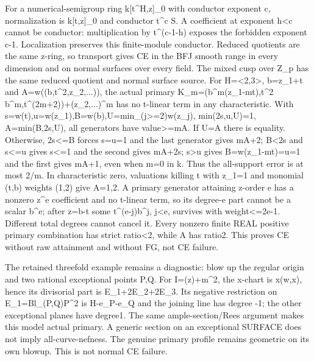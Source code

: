 \documentclass[11pt]{article}
\begin{document}
For a numerical-semigroup ring k[t\textasciicircum{}H,z]\_0 with conductor exponent c, normalization is k[t,z]\_0 and conductor t\textasciicircum{}c S. A coefficient at exponent h\textless{}c cannot be conductor: multiplication by t\textasciicircum{}(c-1-h) exposes the forbidden exponent c-1. Localization preserves this finite-module conductor. Reduced quotients are the same z-ring, so transport gives CE in the BFJ smooth range in every dimension and on normal surfaces over every field. The mixed cusp over Z\_p has the same reduced quotient and normal surface source. For H=\textless{}2,3\textgreater{}, b=z\_1+t and A=w((b,t\textasciicircum{}2,z\_2,...)), the actual primary K\_m=(b\textasciicircum{}m(z\_1-mt),t\textasciicircum{}2 b\textasciicircum{}m,t\textasciicircum{}(2m+2))+(z\_2,...)\textasciicircum{}m has no t-linear term in any characteristic. With s=w(t),u=w(z\_1),B=w(b),U=min\_(j\textgreater{}=2)w(z\_j), min(2s,u,U)=1, A=min(B,2s,U), all generators have value\textgreater{}=mA. If U=A there is equality. Otherwise, 2s\textless{}=B forces s=u=1 and the last generator gives mA+2; B\textless{}2s and s\textless{}=u gives s\textless{}=1 and the second gives mA+2s; s\textgreater{}u gives B=w(z\_1-mt)=u=1 and the first gives mA+1, even when m=0 in k. Thus the all-support error is at most 2/m. In characteristic zero, valuations killing t with z\_1=1 and monomial (t,b) weights (1,2) give A=1,2. A primary generator attaining z-order e has a nonzero z\textasciicircum{}e coefficient and no t-linear term, so its degree-e part cannot be a scalar b\textasciicircum{}e; after z=b-t some t\textasciicircum{}(e-j)b\textasciicircum{}j, j\textless{}e, survives with weight\textless{}=2e-1. Different total degrees cannot cancel it. Every nonzero finite REAL positive primary combination has strict ratio\textless{}2, while A has ratio2. This proves CE without raw attainment and without FG, not CE failure.

The retained threefold example remains a diagnostic: blow up the regular origin and two rational exceptional points P,Q. For I=(z)+m\textasciicircum{}2, the x-chart is x(w,x), hence its divisorial part is E\_1+2E\_2+2E\_3. Its negative restriction on E\_1=Bl\_(P,Q)P\textasciicircum{}2 is H-e\_P-e\_Q and the joining line has degree -1; the other exceptional planes have degree1. The same ample-section/Rees argument makes this model actual primary. A generic section on an exceptional SURFACE does not imply all-curve-nefness. The genuine primary profile remains geometric on its own blowup. This is not normal CE failure.
\end{document}
